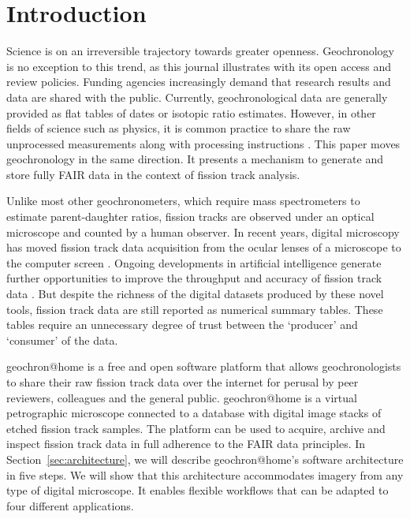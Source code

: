 \documentclass{article}
\begin{document}
\section{Introduction}\label{sec:intro}

Science is on an irreversible trajectory towards greater
openness. Geochronology is no exception to this trend, as this journal
illustrates with its open access and review policies. Funding agencies
increasingly demand that research results and data are shared with the
public. Currently, geochronological data are generally provided as
flat tables of dates or isotopic ratio estimates. However, in other
fields of science such as physics, it is common practice to share the
raw unprocessed measurements along with processing instructions
\citep[e.g.,][]{abbott2016}. This paper moves geochronology in the
same direction. It presents a mechanism to generate and store fully
FAIR \citep[Findable, Accessible, Interoperable and
  Reproducible;][]{wilkinson2016} data in the context of fission track
analysis.\medskip

Unlike most other geochronometers, which require mass spectrometers to
estimate parent-daughter ratios, fission tracks are observed under an
optical microscope and counted by a human observer.  In recent years,
digital microscopy has moved fission track data acquisition from the
ocular lenses of a microscope to the computer screen
\citep{gleadow2009, vanranst2019, gleadow2019}. Ongoing developments
in artificial intelligence generate further opportunities to improve
the throughput and accuracy of fission track data
\citep{nachtergaele2020,li2022,ren2023,boone2025}. But despite the
richness of the digital datasets produced by these novel tools,
fission track data are still reported as numerical summary
tables. These tables require an unnecessary degree of trust between
the `producer' and `consumer' of the data.\medskip

geochron@home is a free and open software platform that allows
geochronologists to share their raw fission track data over the
internet for perusal by peer reviewers, colleagues and the general
public. geochron@home is a virtual petrographic microscope connected to a
database with digital image stacks of etched fission track
samples. The platform can be used to acquire, archive and inspect
fission track data in full adherence to the FAIR data principles. In
Section~\ref{sec:architecture}, we will describe geochron@home's software
architecture in five steps. We will show that this architecture
accommodates imagery from any type of digital microscope. It enables
flexible workflows that can be adapted to four different
applications.\medskip
\end{document}
